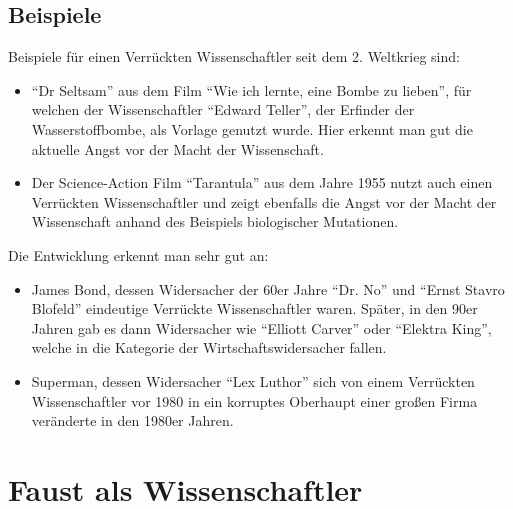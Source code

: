 \documentclass[12pt]{scrreprt}
\begin{document}
\section{Beispiele}
	\label{sec:beispiele}
Beispiele für einen Verrückten Wissenschaftler seit dem 2. Weltkrieg sind:
\begin{itemize}
	\item \enquote{Dr Seltsam} aus dem Film \enquote{Wie ich lernte, eine Bombe zu lieben}, für welchen der Wissenschaftler \enquote{Edward Teller}, der Erfinder der Wasserstoffbombe, als Vorlage genutzt wurde. Hier erkennt man gut die aktuelle Angst vor der Macht der Wissenschaft.
	\item Der Science-Action Film \enquote{Tarantula} aus dem Jahre 1955 nutzt auch einen Verrückten Wissenschaftler und zeigt ebenfalls die Angst vor der Macht der Wissenschaft anhand des Beispiels biologischer Mutationen.
\end{itemize}
Die Entwicklung erkennt man sehr gut an:
\begin{itemize}
	\item James Bond, dessen Widersacher der 60er Jahre \enquote{Dr. No} und \enquote{Ernst Stavro Blofeld} eindeutige Verrückte Wissenschaftler waren. Später, in den 90er Jahren gab es dann Widersacher wie \enquote{Elliott Carver} oder \enquote{Elektra King}, welche in die Kategorie der Wirtschaftswidersacher fallen.
	\item Superman, dessen Widersacher \enquote{Lex Luthor} sich von einem Verrückten Wissenschaftler vor 1980 in ein korruptes Oberhaupt einer großen Firma veränderte in den 1980er Jahren.
\end{itemize}
\autocite{wiki:Verrückter_Wissenschaftler}

\chapter{Faust als Wissenschaftler}
	\label{chap:faust als wissenschaftler}
\end{document}
